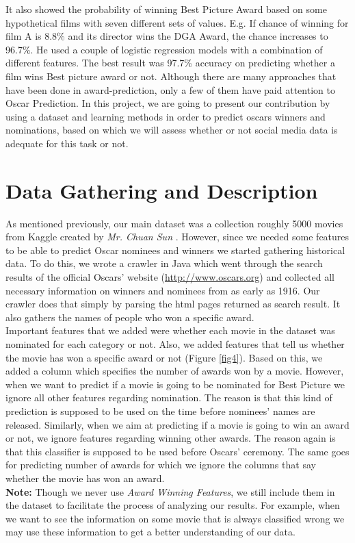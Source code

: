 \documentclass[journal,transmag]{IEEEtran}
\begin{document}
It also showed the probability of winning Best Picture Award based on some hypothetical films with seven different sets of values. E.g. If chance of winning for film A is 8.8\% and its director wins the DGA Award, the chance increases to 96.7\%. He used a couple of logistic regression models with a combination of different features. The best result was 97.7\% accuracy on predicting whether a film wins Best picture award or not\cite{ref5}.
Although there are many approaches that have been done in award-prediction, only a few of them have paid attention to Oscar Prediction. In this project, we are going to present our contribution by using a dataset and learning methods in order to predict oscars winners and nominations, based on which we will assess whether or not social media data is adequate for this task or not.
	
	
	\section{Data Gathering and Description}
As mentioned previously, our main dataset was a collection roughly 5000 movies from Kaggle created by \emph{Mr. Chuan Sun} \cite{refCreator}. However, since we needed some features to be able to predict Oscar nominees and winners we started gathering historical data. To do this, we wrote a crawler in Java which went through the search results of the official Oscars' website (\url{http://www.oscars.org}) and collected all necessary information on winners and nominees from as early as 1916. Our crawler does that simply by parsing the html pages returned as search result. It also gathers the names of people who won a specific award.\\
Important features that we added were whether each movie in the dataset was nominated for each category or not. Also, we added features that tell us whether the movie has won a specific award or not (Figure \ref{fig4}). Based on this, we added a column which specifies the number of awards won by a movie. However, when we want to predict if a movie is going to be nominated for Best Picture we ignore all other features regarding nomination. The reason is that this kind of prediction is supposed to be used on the time before nominees' names are released. Similarly, when we aim at predicting if a movie is going to win an award or not, we ignore features regarding winning other awards. The reason again is that this classifier is supposed to be used before Oscars' ceremony. The same goes for predicting number of awards for which we ignore the columns that say whether the movie has won an award.\\
\textbf{Note:} Though we never use \emph{Award Winning Features}, we still include them in the dataset to facilitate the process of analyzing our results. For example, when we want to see the information on some movie that is always classified wrong we may use these information to get a better understanding of our data.\\
\end{document}
